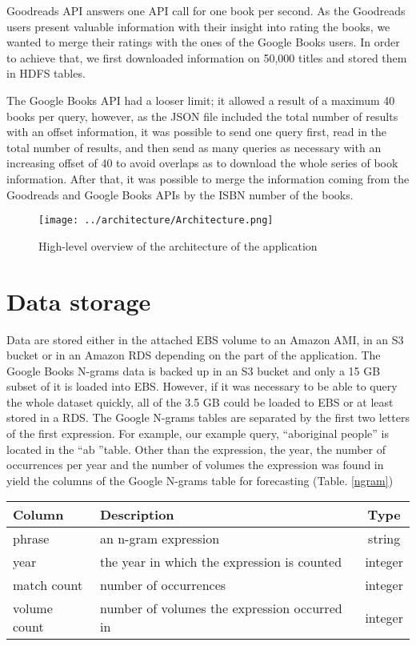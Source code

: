 \documentclass[12pt,letterpaper]{article}
\begin{document}
Goodreads API answers one API call for one book per second. As the Goodreads users present valuable information with their insight into rating the books, we wanted to merge their ratings with the ones of the 
Google Books users. In order to achieve that, we first downloaded information on 50,000 titles and stored them in HDFS tables.

The Google Books API had a looser limit; it allowed a result of a maximum 40 books per query, however, as the JSON file included the total number of results with an offset information, it was possible to send
one query first, read in the total number of results, and then send as many queries as necessary with an increasing offset of 40 to avoid overlaps as to download the whole series of book information. After that, 
it was possible to merge the information coming from the Goodreads and Google Books APIs by the ISBN number of the books.




\begin{figure}[!ht]
\texttt{[image: ../architecture/Architecture.png]}
\caption{High-level overview of the architecture of the application \label{architecture}}
\end{figure}


\section{Data storage}

Data are stored either in the attached EBS volume to an Amazon AMI, in an S3 bucket or in an Amazon RDS depending on the part of the application. The Google Books N-grams data is backed up in an S3 bucket and 
only a 15 GB subset of it is loaded into EBS. However, if it was necessary to be able to query the whole dataset quickly, all of the 3.5 GB could be loaded to EBS or at least stored in a RDS. The Google N-grams
tables are separated by the first two letters of the first expression. For example, our example query, ``aboriginal people'' is located in the ``ab ''table. Other than the expression, the year, the number of 
occurrences per year and the number of volumes the expression was found in yield the columns of the Google N-grams table for forecasting (Table. \ref{ngram})

\begin{center}
\begin{tabular}{llc}
 Column & Description & Type \\
 \hline
 phrase & an n-gram expression  & string \\
 year & the year in which the expression is counted & integer\\
 match count & number of occurrences & integer \\
 volume count & number of volumes the expression occurred in & integer\\
 \hline
\end{tabular}
\end{center}
\end{document}
